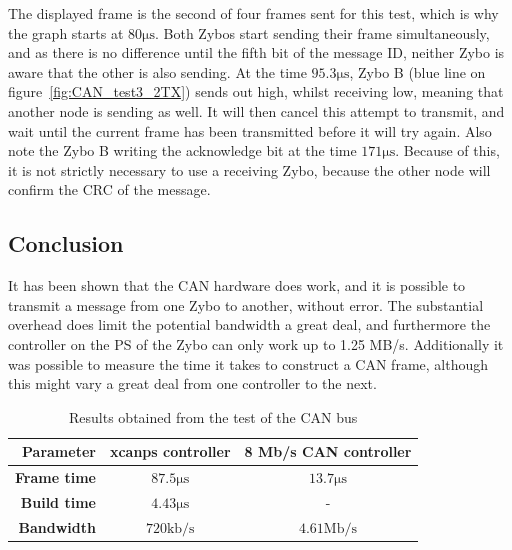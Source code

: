 The displayed frame is the second of four frames sent for this test, which is why the graph starts at $80 \si{\micro\second}$.
Both Zybos start sending their frame simultaneously, and as there is no difference until the fifth bit of the message ID, neither Zybo is aware that the other is also sending.
At the time $95.3\si{\micro\second}$, Zybo B (blue line on figure~\ref{fig:CAN_test3_2TX}) sends out high, whilst receiving low, meaning that another node is sending as well. 
It will then cancel this attempt to transmit, and wait until the current frame has been transmitted before it will try again.
Also note the Zybo B writing the acknowledge bit at the time $171 \si{\micro\second}$.
Because of this, it is not strictly necessary to use a receiving Zybo, because the other node will confirm the CRC of the message.\\

\subsection{Conclusion}\label{sub:CAN_test_conclusion}
It has been shown that the CAN hardware does work, and it is possible to transmit a message from one Zybo to another, without error.
The substantial overhead does limit the potential bandwidth a great deal, and furthermore the controller on the PS of the Zybo can only work up to 1.25 MB/s. 
Additionally it was possible to measure the time it takes to construct a CAN frame, although this might vary a great deal from one controller to the next.

\begin{table}[h!]
	\centering
	\begin{tabular}{r | c | c}
		\textbf{Parameter} & \textbf{xcanps controller} & \textbf{8 Mb/s CAN controller} \\
		\hline
		\textbf{Frame time} & $87.5 \si{\micro\second}$ & $13.7\si{\micro\second}$ \\
		\textbf{Build time} & $4.43 \si{\micro\second}$ & - \\
		\textbf{Bandwidth} & $720 \mathrm{kb/s}$ & $4.61 \mathrm{Mb/s}$
	\end{tabular}
	\caption{Results obtained from the test of the CAN bus}
	\label{tab:CAN_test_conclusion}
\end{table}
